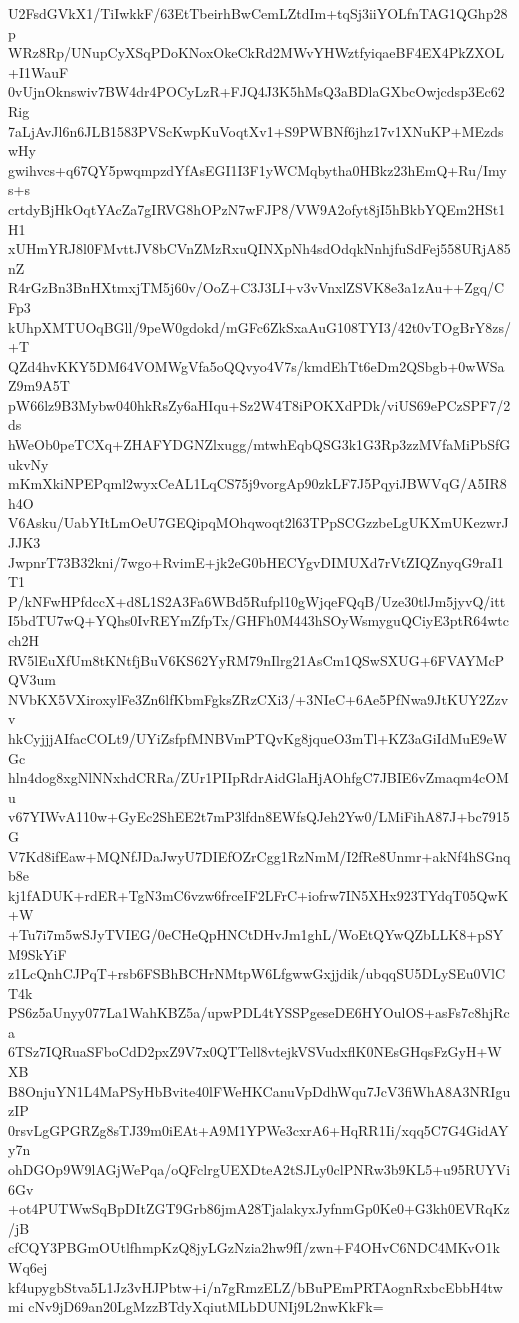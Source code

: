 U2FsdGVkX1/TiIwkkF/63EtTbeirhBwCemLZtdIm+tqSj3iiYOLfnTAG1QGhp28p
WRz8Rp/UNupCyXSqPDoKNoxOkeCkRd2MWvYHWztfyiqaeBF4EX4PkZXOL+I1WauF
0vUjnOknswiv7BW4dr4POCyLzR+FJQ4J3K5hMsQ3aBDlaGXbcOwjcdsp3Ec62Rig
7aLjAvJl6n6JLB1583PVScKwpKuVoqtXv1+S9PWBNf6jhz17v1XNuKP+MEzdswHy
gwihvcs+q67QY5pwqmpzdYfAsEGI1I3F1yWCMqbytha0HBkz23hEmQ+Ru/Imys+s
crtdyBjHkOqtYAcZa7gIRVG8hOPzN7wFJP8/VW9A2ofyt8jI5hBkbYQEm2HSt1H1
xUHmYRJ8l0FMvttJV8bCVnZMzRxuQINXpNh4sdOdqkNnhjfuSdFej558URjA85nZ
R4rGzBn3BnHXtmxjTM5j60v/OoZ+C3J3LI+v3vVnxlZSVK8e3a1zAu++Zgq/CFp3
kUhpXMTUOqBGll/9peW0gdokd/mGFc6ZkSxaAuG108TYI3/42t0vTOgBrY8zs/+T
QZd4hvKKY5DM64VOMWgVfa5oQQvyo4V7s/kmdEhTt6eDm2QSbgb+0wWSaZ9m9A5T
pW66lz9B3Mybw040hkRsZy6aHIqu+Sz2W4T8iPOKXdPDk/viUS69ePCzSPF7/2ds
hWeOb0peTCXq+ZHAFYDGNZlxugg/mtwhEqbQSG3k1G3Rp3zzMVfaMiPbSfGukvNy
mKmXkiNPEPqml2wyxCeAL1LqCS75j9vorgAp90zkLF7J5PqyiJBWVqG/A5IR8h4O
V6Asku/UabYItLmOeU7GEQipqMOhqwoqt2l63TPpSCGzzbeLgUKXmUKezwrJJJK3
JwpnrT73B32kni/7wgo+RvimE+jk2eG0bHECYgvDIMUXd7rVtZIQZnyqG9raI1T1
P/kNFwHPfdccX+d8L1S2A3Fa6WBd5Rufpl10gWjqeFQqB/Uze30tlJm5jyvQ/itt
I5bdTU7wQ+YQhs0IvREYmZfpTx/GHFh0M443hSOyWsmyguQCiyE3ptR64wtcch2H
RV5lEuXfUm8tKNtfjBuV6KS62YyRM79nIlrg21AsCm1QSwSXUG+6FVAYMcPQV3um
NVbKX5VXiroxylFe3Zn6lfKbmFgksZRzCXi3/+3NIeC+6Ae5PfNwa9JtKUY2Zzvv
hkCyjjjAIfacCOLt9/UYiZsfpfMNBVmPTQvKg8jqueO3mTl+KZ3aGiIdMuE9eWGc
hln4dog8xgNlNNxhdCRRa/ZUr1PIIpRdrAidGlaHjAOhfgC7JBIE6vZmaqm4cOMu
v67YIWvA110w+GyEc2ShEE2t7mP3lfdn8EWfsQJeh2Yw0/LMiFihA87J+bc7915G
V7Kd8ifEaw+MQNfJDaJwyU7DIEfOZrCgg1RzNmM/I2fRe8Unmr+akNf4hSGnqb8e
kj1fADUK+rdER+TgN3mC6vzw6frceIF2LFrC+iofrw7IN5XHx923TYdqT05QwK+W
+Tu7i7m5wSJyTVIEG/0eCHeQpHNCtDHvJm1ghL/WoEtQYwQZbLLK8+pSYM9SkYiF
z1LcQnhCJPqT+rsb6FSBhBCHrNMtpW6LfgwwGxjjdik/ubqqSU5DLySEu0VlCT4k
PS6z5aUnyy077La1WahKBZ5a/upwPDL4tYSSPgeseDE6HYOulOS+asFs7c8hjRca
6TSz7IQRuaSFboCdD2pxZ9V7x0QTTell8vtejkVSVudxflK0NEsGHqsFzGyH+WXB
B8OnjuYN1L4MaPSyHbBvite40lFWeHKCanuVpDdhWqu7JcV3fiWhA8A3NRIguzIP
0rsvLgGPGRZg8sTJ39m0iEAt+A9M1YPWe3cxrA6+HqRR1Ii/xqq5C7G4GidAYy7n
ohDGOp9W9lAGjWePqa/oQFclrgUEXDteA2tSJLy0clPNRw3b9KL5+u95RUYVi6Gv
+ot4PUTWwSqBpDItZGT9Grb86jmA28TjalakyxJyfnmGp0Ke0+G3kh0EVRqKz/jB
cfCQY3PBGmOUtlfhmpKzQ8jyLGzNzia2hw9fI/zwn+F4OHvC6NDC4MKvO1kWq6ej
kf4upygbStva5L1Jz3vHJPbtw+i/n7gRmzELZ/bBuPEmPRTAognRxbcEbbH4twmi
cNv9jD69an20LgMzzBTdyXqiutMLbDUNIj9L2nwKkFk=
